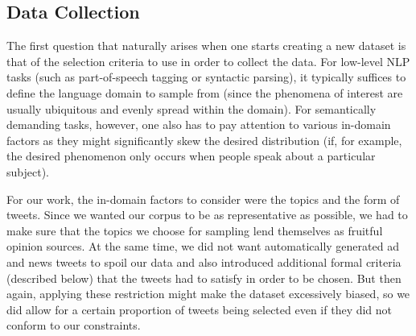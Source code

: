 

\subsection{Data Collection}

The first question that naturally arises when one starts creating a
new dataset is that of the selection criteria to use in order to
collect the data.  For low-level NLP tasks (such as part-of-speech
tagging or syntactic parsing), it typically suffices to define the
language domain to sample from (since the phenomena of interest are
usually ubiquitous and evenly spread within the domain).  For
semantically demanding tasks, however, one also has to pay attention
to various in-domain factors as they might significantly skew the
desired distribution (if, for example, the desired phenomenon only
occurs when people speak about a particular subject).

For our work, the in-domain factors to consider were the topics and
the form of tweets.  Since we wanted our corpus to be as
representative as possible, we had to make sure that the topics we
choose for sampling lend themselves as fruitful opinion sources.  At
the same time, we did not want automatically generated ad and news
tweets to spoil our data and also introduced additional formal
criteria (described below) that the tweets had to satisfy in order to
be chosen.  But then again, applying these restriction might make the
dataset excessively biased, so we did allow for a certain proportion
of tweets being selected even if they did not conform to our
constraints.

